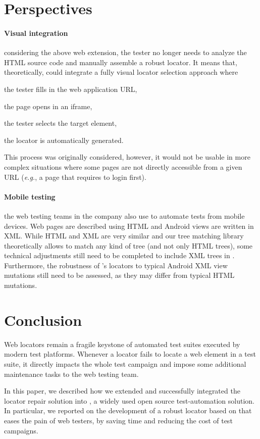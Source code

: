 \section{Perspectives}\label{sec:perspectives}
\paragraph{Visual integration}
considering the above \erratum web extension, the tester no longer needs to analyze the HTML source code and manually assemble a robust locator.
It means that, theoretically, \cerberus could integrate a fully visual locator selection approach where
\begin{inparaenum}[\em (i)]
    \item the tester fills in the web application URL,
    \item the page opens in an iframe,
    \item the tester selects the target element,
    \item the \erratum locator is automatically generated.
\end{inparaenum}
This process was originally considered, however, it would not be usable in more complex situations where some pages are not directly accessible from a given URL (\emph{e.g.}, a page that requires to login first).

\paragraph{Mobile testing}
the web testing teams in the \laredoute{} company also use \cerberus to automate tests from mobile devices.
Web pages are described using HTML and Android views are written in XML.
While HTML and XML are very similar and our tree matching library theoretically allows \erratum to match any kind of tree (and not only HTML trees), some technical adjustments still need to be completed to include XML trees in \cerberus.
Furthermore, the robustness of \erratum's locators to typical Android XML view mutations still need to be assessed, as they may differ from typical HTML mutations.

\section{Conclusion}\label{sec:conclusion}
Web locators remain a fragile keystone of automated test suites executed by modern test platforms.
Whenever a locator fails to locate a web element in a test suite, it directly impacts the whole test campaign and impose some additional maintenance tasks to the web testing team.

In this paper, we described how we extended and successfully integrated the locator repair solution \erratum into \cerberus, a widely used open source test-automation solution.
In particular, we reported on the development of a robust locator based on \erratum that eases the pain of web testers, by saving time and reducing the cost of test campaigns.
